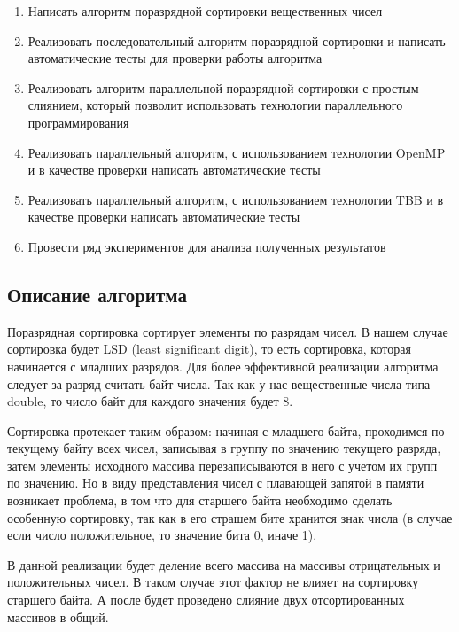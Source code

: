 \documentclass{report}
\begin{document}
\begin{enumerate} 

\item Написать алгоритм поразрядной сортировки вещественных чисел
\item Реализовать последовательный алгоритм поразрядной сортировки и написать автоматические тесты для проверки работы алгоритма
\item Реализовать алгоритм параллельной поразрядной сортировки с простым слиянием, который позволит использовать технологии параллельного программирования 
\item Реализовать параллельный алгоритм, с использованием технологии OpenMP и в качестве проверки написать автоматические тесты
\item Реализовать параллельный алгоритм, с использованием технологии TBB и в качестве проверки написать автоматические тесты
\item Провести ряд экспериментов для анализа полученных результатов

\end{enumerate} 

\newpage

\begin{center}\section*{Описание алгоритма}\end{center}

\par Поразрядная сортировка сортирует элементы по разрядам чисел. В нашем случае сортировка будет LSD (least significant digit), то есть сортировка, которая начинается с младших разрядов. Для более эффективной реализации алгоритма следует за разряд считать байт числа. Так как у нас вещественные числа типа double, то число байт для каждого значения будет 8.
\par Сортировка протекает таким образом: начиная с младшего байта, проходимся по текущему байту всех чисел, записывая в группу по значению текущего разряда, затем элементы исходного массива перезаписываются в него с учетом их групп по значению. Но в виду представления чисел с плавающей запятой в памяти возникает проблема, в том что для старшего байта необходимо сделать особенную сортировку, так как в его страшем бите хранится знак числа (в случае если число положительное, то значение бита 0, иначе 1).
\par В данной реализации будет деление всего массива на массивы отрицательных и положительных чисел. В таком случае этот фактор не влияет на сортировку старшего байта. А после будет проведено слияние двух отсортированных массивов в общий.
\end{document}
